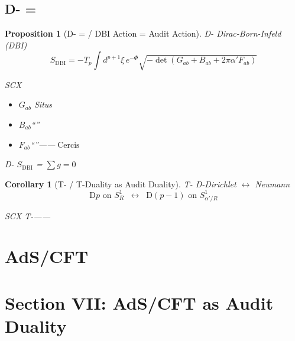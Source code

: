 \documentclass[12pt,a4paper]{article}
\theoremstyle{plain}
\newtheorem{proposition}[theorem]{ Proposition}
\newtheorem{corollary}[theorem]{ Corollary}
\theoremstyle{definition}
\DeclareMathOperator{\Cercis}{Cercis}
\begin{document}

\subsection{D- = }

\begin{proposition}[D- =  / DBI Action = Audit Action]
D- Dirac-Born-Infeld (DBI) 
\begin{equation}
    S_{\text{DBI}} = -T_p \int d^{p+1}\xi \, e^{-\Phi} \sqrt{-\det(G_{ab} + B_{ab} + 2\pi\alpha' F_{ab})}
\end{equation}

 SCX \textbf{}
\begin{itemize}
    \item $G_{ab}$ Situs 
    \item $B_{ab}$``''
    \item $F_{ab}$``''——$\Cercis$ 
\end{itemize}

D- $S_{\text{DBI}}$  =  $\sum g = 0$ 
\end{proposition}

\begin{corollary}[T- / T-Duality as Audit Duality]
T- D-Dirichlet $\leftrightarrow$ Neumann 
\begin{equation}
    \text{D}p \text{ on } S^1_R \;\; \longleftrightarrow \;\; \text{D}(p-1) \text{ on } S^1_{\alpha'/R}
\end{equation}

 SCX T-\textbf{}——

\end{corollary}

\newpage


\section{AdS/CFT }
\section*{Section VII: AdS/CFT as Audit Duality}
\end{document}
